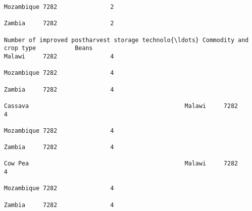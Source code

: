 \documentclass[11pt]{article}
\begin{document}
\begin{Verbatim}[commandchars=\\\{\}]
                                                                                                                                                                                                                 Mozambique 7282               2  
                                                                                                                                                                                                                 Zambia     7282               2  
                                                                         Number of improved postharvest storage technolo{\ldots} Commodity and crop type           Beans                                              Malawi     7282               4  
                                                                                                                                                                                                                 Mozambique 7282               4  
                                                                                                                                                                                                                 Zambia     7282               4  
                                                                                                                                                              Cassava                                            Malawi     7282               4  
                                                                                                                                                                                                                 Mozambique 7282               4  
                                                                                                                                                                                                                 Zambia     7282               4  
                                                                                                                                                              Cow Pea                                            Malawi     7282               4  
                                                                                                                                                                                                                 Mozambique 7282               4  
                                                                                                                                                                                                                 Zambia     7282               4  

\end{Verbatim}
\end{document}
